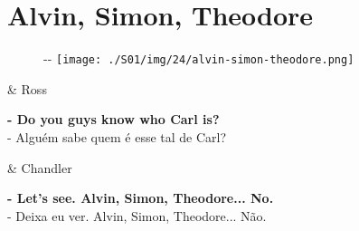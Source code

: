 \hypertarget{alvin-simon-theodore}{%
\section{Alvin, Simon, Theodore}\label{alvin-simon-theodore}}

\begin{figure}[!ht]
  \begin{adjustwidth}{-\oddsidemargin-1in}{-\rightmargin}
    \centering
    \texttt{[image: ./S01/img/24/alvin-simon-theodore.png]}
  \end{adjustwidth}
\end{figure}

\begin{tcolorbox}[enhanced,center upper,
    drop fuzzy shadow southeast, boxrule=0.3pt,
    lower separated=false, breakable,
    colframe=black!30!dialogoBorder,colback=white]
\begin{minipage}[c]{0.16\linewidth}
   & \centering \scriptsize{Ross}
\end{minipage}
\hfill
\begin{minipage}[c]{0.8\linewidth}
  \textbf{- Do you guys know who Carl is?}\\
  - Alguém sabe quem é esse tal de Carl?
\end{minipage}

\medskip
\begin{minipage}[c]{0.16\linewidth}
   & \centering \scriptsize{Chandler}
\end{minipage}
\hfill
\begin{minipage}[c]{0.8\linewidth}
  \textbf{- Let's see. Alvin, Simon, Theodore... No.}\\
  - Deixa eu ver. Alvin, Simon, Theodore... Não.
\end{minipage}
\end{tcolorbox}

